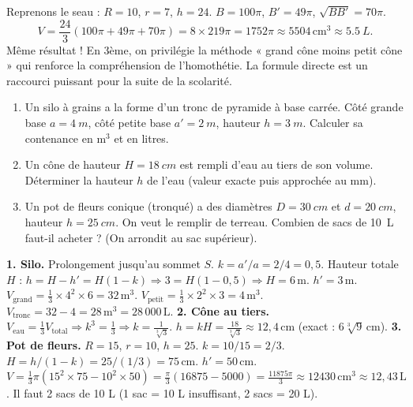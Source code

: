 \documentclass[11pt]{article}
\begin{document}
\begin{exemplebox}
Reprenons le seau : $R=10$, $r=7$, $h=24$. $B = 100\pi$, $B' = 49\pi$, $\sqrt{BB'} = 70\pi$.
\[
V = \frac{24}{3}(100\pi + 49\pi + 70\pi) = 8 \times 219\pi = 1752\pi \approx 5504\,\text{cm}^3 \approx \SI{5,5}{L}.
\]
Même résultat ! En 3ème, on privilégie la méthode « grand cône moins petit cône » qui renforce la compréhension de l'homothétie. La formule directe est un raccourci puissant pour la suite de la scolarité.
\end{exemplebox}

\begin{exercice}
\begin{enumerate}
\item Un silo à grains a la forme d'un tronc de pyramide à base carrée. Côté grande base $a = \SI{4}{m}$, côté petite base $a' = \SI{2}{m}$, hauteur $h = \SI{3}{m}$. Calculer sa contenance en $\text{m}^3$ et en litres.
\item Un cône de hauteur $H = \SI{18}{cm}$ est rempli d'eau au tiers de son volume. Déterminer la hauteur $h$ de l'eau (valeur exacte puis approchée au mm).
\item Un pot de fleurs conique (tronqué) a des diamètres $D = \SI{30}{cm}$ et $d = \SI{20}{cm}$, hauteur $h = \SI{25}{cm}$. On veut le remplir de terreau. Combien de sacs de \SI{10}{L} faut-il acheter ? (On arrondit au sac supérieur).
\end{enumerate}
\end{exercice}

\begin{corrige}[Exercice n°1]
\textbf{1. Silo.} Prolongement jusqu'au sommet $S$. $k = a'/a = 2/4 = 0,5$. Hauteur totale $H$ : $h = H - h' = H(1-k) \Rightarrow 3 = H(1-0,5) \Rightarrow H = 6\,\text{m}$. $h' = 3\,\text{m}$.
$V_{\text{grand}} = \frac{1}{3} \times 4^2 \times 6 = 32\,\text{m}^3$. $V_{\text{petit}} = \frac{1}{3} \times 2^2 \times 3 = 4\,\text{m}^3$.
$V_{\text{tronc}} = 32 - 4 = 28\,\text{m}^3 = 28\,000\,\text{L}$.
\textbf{2. Cône au tiers.} $V_{\text{eau}} = \frac{1}{3}V_{\text{total}} \Rightarrow k^3 = \frac{1}{3} \Rightarrow k = \frac{1}{\sqrt[3]{3}}$. $h = kH = \frac{18}{\sqrt[3]{3}} \approx 12,4\,\text{cm}$ (exact : $6\sqrt[3]{9}\,\text{cm}$).
\textbf{3. Pot de fleurs.} $R=15$, $r=10$, $h=25$. $k = 10/15 = 2/3$. $H = h/(1-k) = 25/(1/3) = 75\,\text{cm}$. $h' = 50\,\text{cm}$.
$V = \frac{1}{3}\pi(15^2\times75 - 10^2\times50) = \frac{\pi}{3}(16875 - 5000) = \frac{11875\pi}{3} \approx 12430\,\text{cm}^3 \approx 12,43\,\text{L}$.
Il faut 2 sacs de 10 L (1 sac = 10 L insuffisant, 2 sacs = 20 L).
\end{corrige}
\end{document}
